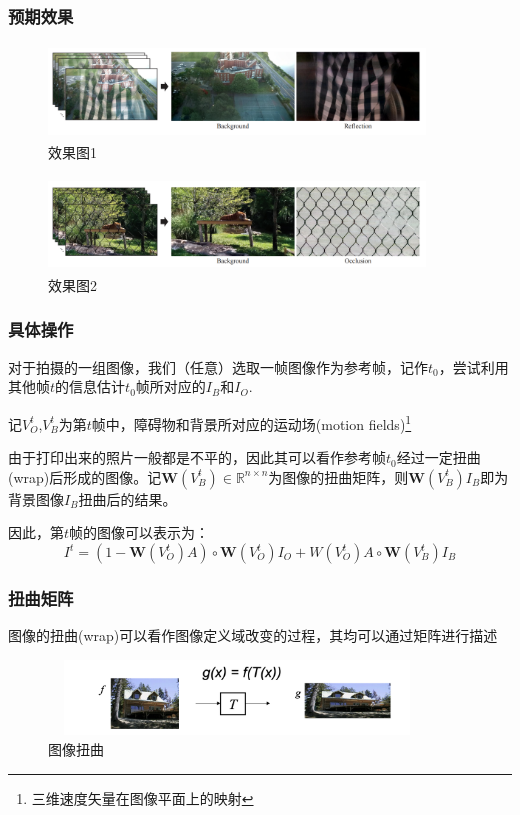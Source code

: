 \documentclass{beamer}
\begin{document}
\begin{frame}
\frametitle{预期效果}
\begin{figure}[!h]
\centering
\includegraphics[height=2.5cm,width=10cm]{2022121601.png}
\caption{效果图1}
\end{figure}
\begin{figure}[!h]
\centering
\includegraphics[height=2.5cm,width=10cm]{2022121602.png}
\caption{效果图2}
\end{figure}
\end{frame}
\begin{frame}
\frametitle{具体操作}
对于拍摄的一组图像，我们（任意）选取一帧图像作为参考帧，记作$t_0$，尝试利用其他帧$t$的信息估计$t_0$帧所对应的$I_B$和$I_O$.\pause

记$V^t_O$,$V^t_B$为第$t$帧中，障碍物和背景所对应的运动场(motion fields)\footnote{三维速度矢量在图像平面上的映射}\pause

由于打印出来的照片一般都是不平的，因此其可以看作参考帧$t_0$经过一定扭曲(wrap)后形成的图像。记$\textbf{W}(V_B^t)\in\mathbb{R}^{n\times n}$为图像的扭曲矩阵，则$\textbf{W}(V_B^t)I_B$即为背景图像$I_B$扭曲后的结果。\pause

因此，第$t$帧的图像可以表示为：
\begin{equation}
I^t = (1-\textbf{W}(V_O^t)A)\circ\textbf{W}(V_O^t)I_O+W(V_O^t)A\circ\textbf{W}(V_B^t)I_B
\end{equation}
\end{frame}
\begin{frame}
\frametitle{扭曲矩阵}
图像的扭曲(wrap)可以看作图像定义域改变的过程，其均可以通过矩阵进行描述

\begin{figure}[!h]
\centering
\includegraphics[height=2cm,width=10cm]{2022122601.png}
\caption{图像扭曲}
\end{figure}
\end{frame}
\end{document}
